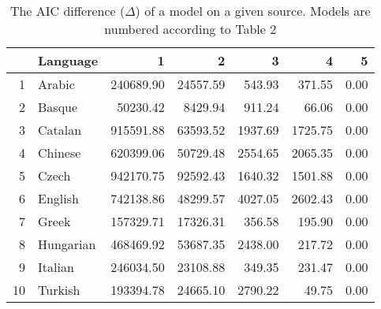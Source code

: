 \begin{table}[ht]
\centering
\begin{tabular}{rlrrrrr}
  \toprule
 & Language & 1 & 2 & 3 & 4 & 5 \\ \midrule
1 & Arabic & 240689.90 & 24557.59 & 543.93 & 371.55 & 0.00 \\ 
  2 & Basque & 50230.42 & 8429.94 & 911.24 & 66.06 & 0.00 \\ 
  3 & Catalan & 915591.88 & 63593.52 & 1937.69 & 1725.75 & 0.00 \\ 
  4 & Chinese & 620399.06 & 50729.48 & 2554.65 & 2065.35 & 0.00 \\ 
  5 & Czech & 942170.75 & 92592.43 & 1640.32 & 1501.88 & 0.00 \\ 
  6 & English & 742138.86 & 48299.57 & 4027.05 & 2602.43 & 0.00 \\ 
  7 & Greek & 157329.71 & 17326.31 & 356.58 & 195.90 & 0.00 \\ 
  8 & Hungarian & 468469.92 & 53687.35 & 2438.00 & 217.72 & 0.00 \\ 
  9 & Italian & 246034.50 & 23108.88 & 349.35 & 231.47 & 0.00 \\ 
  10 & Turkish & 193394.78 & 24665.10 & 2790.22 & 49.75 & 0.00 \\ 
   \bottomrule
\end{tabular}
\caption{The AIC difference ($\Delta$) of a model on a given source. Models are 
numbered according to Table 2}
\label{table4}
\end{table}


